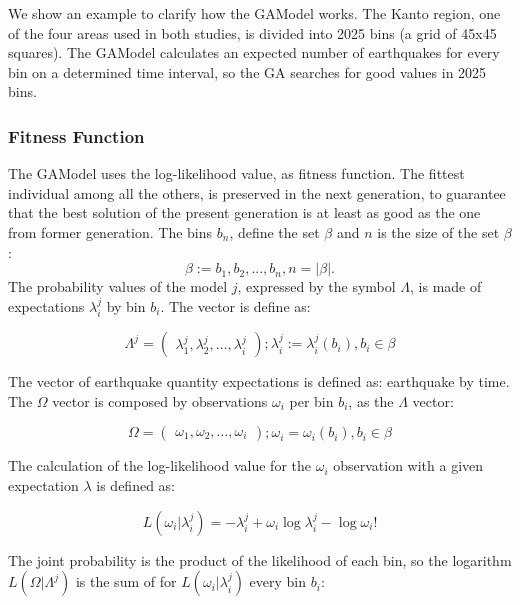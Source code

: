 We show an example to clarify how the GAModel works. The Kanto region, one of the four areas used in both studies, is divided into 2025 bins (a grid of 45x45 squares). The GAModel calculates an expected number of earthquakes for every bin on a determined time interval, so the GA searches for good values in 2025 bins.
\subsubsection{Fitness Function}\label{fitGA}

The GAModel uses the log-likelihood value, as fitness
function. The fittest individual among all the others, is preserved in the next generation, to guarantee that the best solution of the present generation is at least as good as the one from former generation.  The bins $b_n$, define the set $\beta$ and $n$ is the size of the set $\beta$:
\begin{equation} 
\beta := {b_1,b_2,...,b_n},n = |\beta|.
\end{equation}
The probability values of the model $j$, expressed by the symbol
$\Lambda$, is made of expectations $\lambda_i^j$ by bin $b_i$. The
vector is define as:

\begin{equation}
\Lambda^j = 
\begin{pmatrix}
\lambda_1^j, 
\lambda_2^j, 
\hdots,
\lambda_i^j
\end{pmatrix}
;\lambda_i^j := \lambda_i^j(b_i),b_i \in \beta
\end{equation}

The vector of earthquake quantity expectations is defined as:
earthquake by time. The $\Omega$ vector is composed by observations
$\omega_i$ per bin $b_i$, as the $\Lambda$ vector:

\begin{equation}
\Omega = 
\begin{pmatrix}
\omega_1,
\omega_2,
\hdots,
\omega_i
\end{pmatrix}
;\omega_i =\omega_i(b_i),b_i \in \beta
\end{equation}

The calculation of the log-likelihood value for the $\omega_i$
observation with a given expectation $\lambda$ is defined as:


\begin{equation}
L(\omega_i|\lambda_i^j) = -\lambda_i^j + \omega_i\log\lambda_i^j - \log\omega_i!
\end{equation}

The joint probability is the product of the likelihood of each bin, so the logarithm $L(\Omega|\Lambda^j)$ is the sum of for
$L(\omega_i|\lambda_i^j)$ every bin $b_i$:


